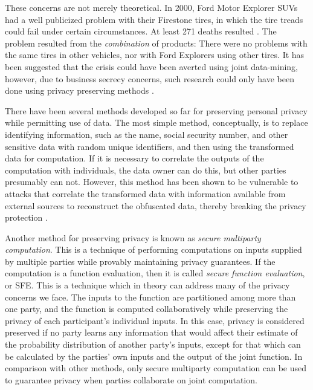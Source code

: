 These concerns are not merely theoretical. In 2000, Ford Motor Explorer
SUVs had a well publicized problem with their Firestone tires, in
which the tire treads could fail under certain circumstances. At least
271 deaths resulted \cite{NYTFordFirestone}. The problem resulted
from the \emph{combination} of products: There were no problems with
the same tires in other vehicles, nor with Ford Explorers using other
tires. It has been suggested that the crisis could have been averted
using joint data-mining, however, due to business secrecy concerns,
such research could only have been done using privacy preserving methods
\cite{VaidyaClifton:2002}.

There have been several methods developed so far for preserving personal
privacy while permitting use of data. The most simple method, conceptually,
is to replace identifying information, such as the name, social security
number, and other sensitive data with random unique identifiers, and
then using the transformed data for computation. If it is necessary
to correlate the outputs of the computation with individuals, the
data owner can do this, but other parties presumably can not. However,
this method has been shown to be vulnerable to attacks that correlate
the transformed data with information available from external sources
to reconstruct the obfuscated data, thereby breaking the privacy protection
\cite{Malin04}. 

Another method for preserving privacy is known as \emph{secure multiparty
computation}\cite{Yao86}. This is a technique of performing computations on inputs
supplied by multiple parties while provably maintaining privacy guarantees.
If the computation is a function evaluation, then it is called \emph{secure
function evaluation}, or SFE. This is a technique which in theory can address
many of the privacy concerns we face. The inputs to
the function are partitioned among more than one party, and the function
is computed collaboratively while preserving the privacy of each participant's
individual inputs. In this case, privacy is considered preserved if
no party learns any information that would affect their estimate of
the probability distribution of another party's inputs, except for
that which can be calculated by the parties' own inputs and the output
of the joint function. In comparison with other methods, only secure
multiparty computation can be used to guarantee privacy when parties
collaborate on joint computation. %
\begin{comment}
%
\begin{lyxgreyedout}
Needs clarification
\end{lyxgreyedout}
 In other words, the entropy gain of each party is equivalent to the
entropy gain in an idealized protocol where a trusted third party
collects all the inputs, evaluates the function, and transmits only
the output to each party. Depending on the protocol, the guarantees
for some parties may be based on typical assumptions of computational
hardness, while the guarantees for other parties may be information
theoretic.
\end{comment}
{}

